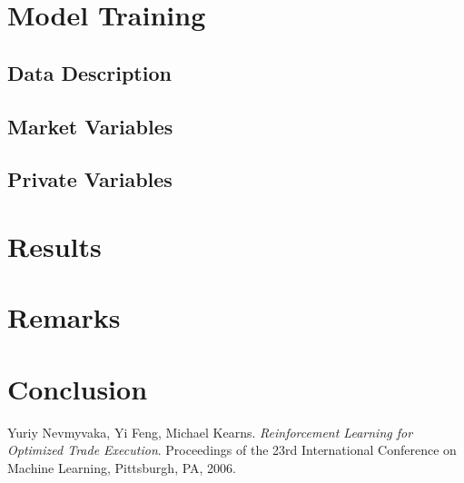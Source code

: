 \documentclass[12pt]{extarticle}
\begin{document}
\section{Model Training}
\subsection{Data Description}

\subsection{Market Variables} \label{market-variables}

\subsection{Private Variables} \label{private-variables}

\section{Results}

\section{Remarks}

\section{Conclusion}

\begin{thebibliography}{9}
Yuriy Nevmyvaka, Yi Feng, Michael Kearns.
\textit{Reinforcement Learning for Optimized Trade Execution}.
Proceedings of the 23rd International Conference on Machine Learning, Pittsburgh, PA, 2006.
\end{thebibliography}
\end{document}
